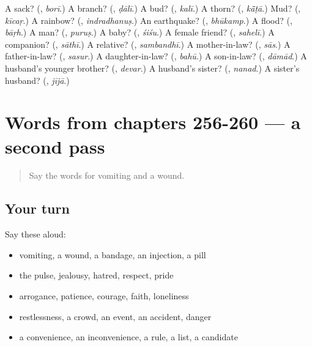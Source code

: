\begin{tcolorbox}[breakable,colback=teal!4,colframe=teal!35!black,title={Before you move on}]
A sack? (\textbf{}, \emph{borī}.) A branch? (\textbf{}, \emph{ḍālī}.) A bud? (\textbf{}, \emph{kalī}.) A thorn? (\textbf{}, \emph{kā̃ṭā}.) Mud? (\textbf{}, \emph{kīcaṛ}.) A rainbow? (\textbf{}, \emph{indradhanuṣ}.) An earthquake? (\textbf{}, \emph{bhūkamp}.) A flood? (\textbf{}, \emph{bāṛh}.) A man? (\textbf{}, \emph{puruṣ}.) A baby? (\textbf{}, \emph{śiśu}.) A female friend? (\textbf{}, \emph{sahelī}.) A companion? (\textbf{}, \emph{sāthī}.) A relative? (\textbf{}, \emph{sambandhī}.) A mother-in-law? (\textbf{}, \emph{sās}.) A father-in-law? (\textbf{}, \emph{sasur}.) A daughter-in-law? (\textbf{}, \emph{bahū}.) A son-in-law? (\textbf{}, \emph{dāmād}.) A husband's younger brother? (\textbf{}, \emph{devar}.) A husband's sister? (\textbf{}, \emph{nanad}.) A sister's husband? (\textbf{}, \emph{jījā}.)
\end{tcolorbox}
\section[(dialogue)]{Words from chapters 256-260 — a second pass}

\label{lesson:HI-R260-second-pass-words-from-chapters-256-260}



\begin{quote}
Say the words for vomiting and a wound.
\end{quote}

\subsection*{Your turn}
Say these aloud:

\begin{itemize}
\raggedright
  \item vomiting, a wound, a bandage, an injection, a pill
  \item the pulse, jealousy, hatred, respect, pride
  \item arrogance, patience, courage, faith, loneliness
  \item restlessness, a crowd, an event, an accident, danger
  \item a convenience, an inconvenience, a rule, a list, a candidate
\end{itemize}

